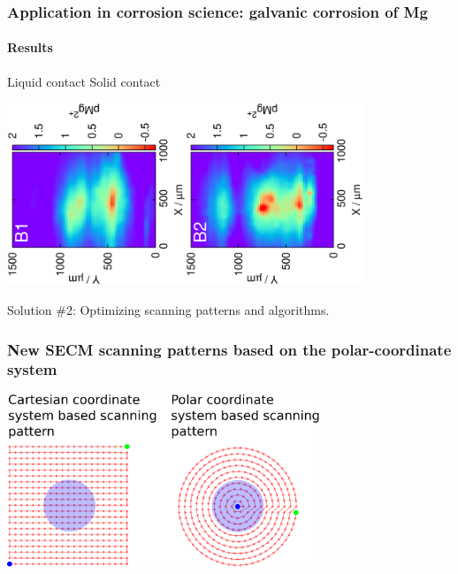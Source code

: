 \documentclass{beamer}
\begin{document}
\begin{frame}
	\frametitle{Application in corrosion science: galvanic corrosion of Mg} 
	\framesubtitle{Results}
	\centering
	\quad\quad\quad\quad Liquid contact \hfill Solid contact \quad\quad\quad\quad\quad

	\includegraphics[trim = 10mm 30mm 0mm 20mm, clip, width=0.4\textwidth, angle=-90]{liquid_coupled.eps}\includegraphics[trim = 10mm 30mm 0mm 20mm, clip, width=0.4\textwidth, angle=-90]{solid_coupled.eps}
\end{frame}



\begin{frame} [plain]
\centering
Solution \#2:
Optimizing scanning patterns and algorithms.
\end{frame}

\begin{frame}
	\frametitle{New SECM scanning patterns based on the polar-coordinate system}
	\centering	
	\includegraphics[width=0.7\textwidth]{cartesian_vs_polar.eps}
	
	\vfill
\end{frame}
\end{document}
